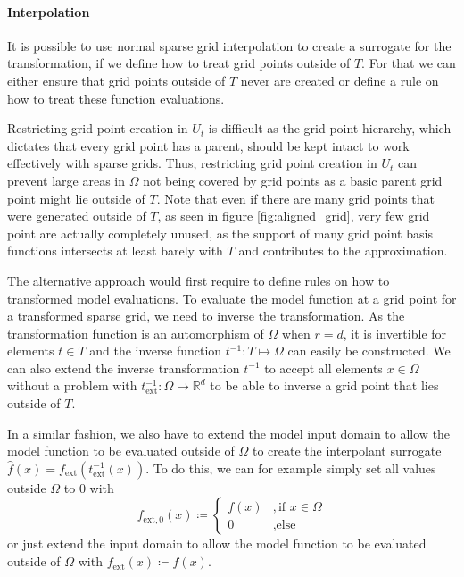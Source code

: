 \documentclass[
  a4paper,  %
  twoside,  %
  bibliography=totoc,
  headsepline,
  cleardoublepage=empty,
  parskip=half,
  draft=false
]{scrbook}
\begin{document}
\paragraph{Interpolation}
It is possible to use normal sparse grid interpolation to create a surrogate for the transformation, if we define how to treat grid points outside of $T$.
For that we can either ensure that grid points outside of $T$ never are created or define a rule on how to treat these function evaluations.

Restricting grid point creation in $U_t$ is difficult as the grid point hierarchy, which dictates that every grid point has a parent, should be kept intact to work effectively with sparse grids.
Thus, restricting grid point creation in $U_t$ can prevent large areas in $\Omega$ not being covered by grid points as a basic parent grid point might lie outside of $T$.
Note that even if there are many grid points that were generated outside of $T$, as seen in figure \cref{fig:aligned_grid}, very few grid point are actually completely unused, as the support of many grid point basis functions intersects at least barely with $T$ and contributes to the approximation.

The alternative approach would first require to define rules on how to transformed model evaluations.
To evaluate the model function at a grid point for a transformed sparse grid, we need to inverse the transformation.
As the transformation function is an automorphism of $\Omega$ when $r=d$, it is invertible for elements $t \in T$ and the inverse function $t^{-1} \colon T \mapsto \Omega$ can easily be constructed.
We can also extend the inverse transformation $t^{-1}$ to accept all elements $x \in \Omega$ without a problem with $t^{-1}_{\text{ext}} \colon \Omega \mapsto \mathds{R}^d$ to be able to inverse a grid point that lies outside of $T$.

In a similar fashion, we also have to extend the model input domain to allow the model function to be evaluated outside of $\Omega$ to create the interpolant surrogate $\hat{f}(x)=f_\text{ext}(t^{-1}_{\text{ext}}(x))$.
To do this, we can for example simply set all values outside $\Omega$ to 0 with
\begin{equation}
f_{\text{ext}, 0}(x) \coloneqq \begin{cases}
f(x)&, \text{if $x \in \Omega$}\\
0&,\text{else}
\end{cases}
\end{equation}
or just extend the input domain to allow the model function to be evaluated outside of $\Omega$ with $f_{\text{ext}}(x) \coloneqq f(x)$.
\end{document}
